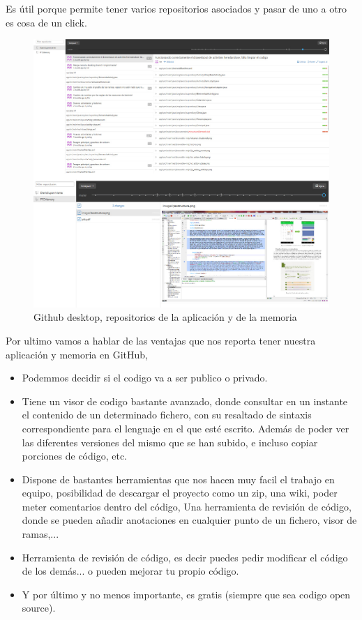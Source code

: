 \documentclass[../pfc.tex]{subfiles}
\begin{document}
	Es útil porque permite tener varios repositorios asociados y pasar de uno a otro es cosa de un click.
	

	\begin{figure}[H]
		\centering
		\includegraphics[width=1\linewidth]{../images/repositoriosGitHub}
		\caption{Github desktop, repositorios de la aplicación y de la memoria}
		\label{fig:ghdesktopA}
	\end{figure}

	Por ultimo vamos a hablar de las ventajas que nos reporta tener nuestra aplicación y memoria en GitHub, 
	\begin{itemize}
		\item Podemmos decidir si el codigo va a ser publico o privado.
		\item Tiene un visor de codigo bastante avanzado, donde consultar en un instante el contenido de un determinado fichero, con su resaltado de sintaxis correspondiente para el lenguaje en el que esté escrito.
		Además de poder ver las diferentes versiones del mismo que se han subido, e incluso copiar porciones de código, etc.
		\item Dispone de bastantes herramientas que nos hacen muy facil el trabajo en equipo, posibilidad de descargar el proyecto como un zip, una wiki, poder meter comentarios dentro del código, Una herramienta de revisión de código, donde se pueden añadir anotaciones en cualquier punto de un fichero, visor de ramas,...
		\item Herramienta de revisión de código, es decir puedes pedir modificar el código de los demás... o pueden mejorar tu propio código.
		\item Y por último y no menos importante, es gratis (siempre que sea codigo open source).
	\end{itemize}
\end{document}

